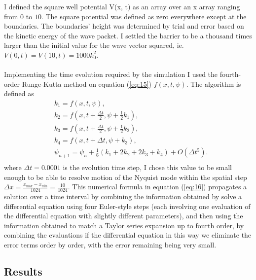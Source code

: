 \documentclass[10pt, a4paper, singlespacing, headsepline]{article}
\begin{document}
I defined the square well potential V(x, t) as an array over an x array ranging from $0$ to $10$. The square potential was defined as zero everywhere except at the boundaries. The boundaries' height was determined by trial and error based on the kinetic energy of the wave packet. I settled the barrier to be a thousand times larger than the initial value for the wave vector squared, \mbox{ie. $V(0, t) = V(10, t) = 1000k_0^2$}.\\\\
Implementing the time evolution required by the simulation I used the fourth-order Runge-Kutta method on equation (\ref{eq:15}) $f(x, t, \psi)$. The algorithm is defined as
\begin{equation} \label{eq:16}
\begin{split}
&k_1 = f(x, t, \psi),\\
&k_2 = f(x, t + \frac{\Delta t}{2}, \psi + \frac{1}{2}k_1),\\
&k_3 = f(x, t + \frac{\Delta t}{2}, \psi + \frac{1}{2}k_2),\\
&k_4 = f(x, t + \Delta t, \psi + k_3),\\
&\psi_{n + 1} = \psi_{n} + \frac{1}{6}(k_1 + 2k_2 + 2k_3 + k_4) + O(\Delta t^5).\\
\end{split}
\end{equation}
where $\Delta t = 0.0001$ is the evolution time step, I chose this value to be small enough to be able to resolve motion of the Nyquist mode within the spatial step 
$\Delta x = \frac{x_{\mathrm{max}} - x_{\mathrm{min}}}{1024} = \frac{10}{1024}$.
This numerical formula in equation (\ref{eq:16}) propagates a solution over a time interval by combining the information obtained by solve a differential equation using four Euler-style steps (each involving one evaluation of the differential equation with slightly different parameters), and then using the information obtained to match a Taylor series expansion up to fourth order, by combining the evaluations if the differential equation in this way we eliminate the error terms order by order, with the error remaining being very small\cite{N_R}.

\subsection{Results}
\end{document}
